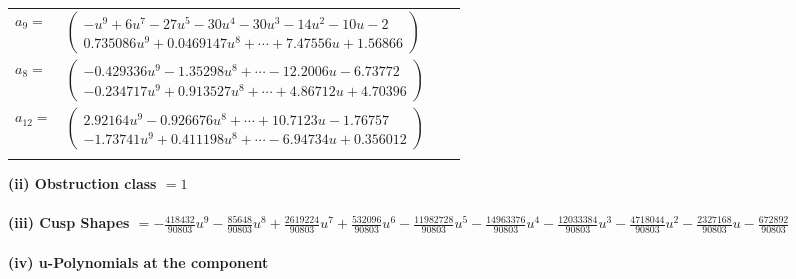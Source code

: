 \documentclass[1p]{elsarticle_modified}
\theoremstyle{definition}
\begin{document}
\begin{tabular}{m{7pt} m{180pt} m{7pt} m{180pt} }
\flushright $a_{9}=$&$\begin{pmatrix}- u^9+6 u^7-27 u^5-30 u^4-30 u^3-14 u^2-10 u-2\\0.735086 u^{9}+0.0469147 u^{8}+\cdots+7.47556 u+1.56866\end{pmatrix}$ \\
\flushright $a_{8}=$&$\begin{pmatrix}-0.429336 u^{9}-1.35298 u^{8}+\cdots-12.2006 u-6.73772\\-0.234717 u^{9}+0.913527 u^{8}+\cdots+4.86712 u+4.70396\end{pmatrix}$ \\
\flushright $a_{12}=$&$\begin{pmatrix}2.92164 u^{9}-0.926676 u^{8}+\cdots+10.7123 u-1.76757\\-1.73741 u^{9}+0.411198 u^{8}+\cdots-6.94734 u+0.356012\end{pmatrix}$\\&\end{tabular}
\flushleft \textbf{(ii) Obstruction class $= 1$}\\~\\
\flushleft \textbf{(iii) Cusp Shapes $= -\frac{418432}{90803} u^9-\frac{85648}{90803} u^8+\frac{2619224}{90803} u^7+\frac{532096}{90803} u^6-\frac{11982728}{90803} u^5-\frac{14963376}{90803} u^4-\frac{12033384}{90803} u^3-\frac{4718044}{90803} u^2-\frac{2327168}{90803} u-\frac{672892}{90803}$}\\~\\
\newpage\renewcommand{\arraystretch}{1}
\flushleft \textbf{(iv) u-Polynomials at the component}\newline \\
\end{document}
